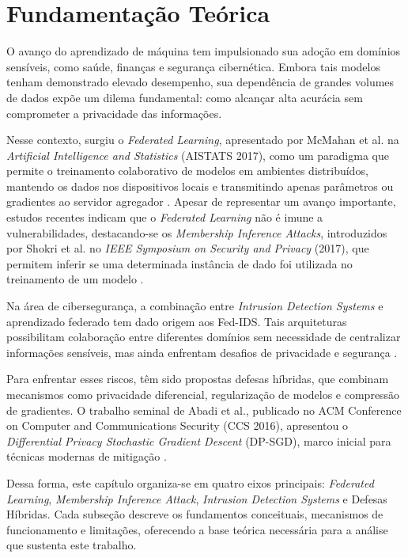 \documentclass[
	12pt,				%
	openright,			%
	oneside,			%
	a4paper,			%
	english,			%
	french,				%
	spanish,			%
	brazil,				%
	]{abntex2}
\begin{document}
\chapter{Fundamentação Teórica}
O avanço do aprendizado de máquina tem impulsionado sua adoção em domínios sensíveis, como saúde, finanças e segurança cibernética. Embora tais modelos tenham demonstrado elevado desempenho, sua dependência de grandes volumes de dados expõe um dilema fundamental: como alcançar alta acurácia sem comprometer a privacidade das informações.

Nesse contexto, surgiu o \textit{Federated Learning}, apresentado por McMahan et al. na \textit{Artificial Intelligence and Statistics} (AISTATS 2017), como um paradigma que permite o treinamento colaborativo de modelos em ambientes distribuídos, mantendo os dados nos dispositivos locais e transmitindo apenas parâmetros ou gradientes ao servidor agregador \cite{mcmahan2017fedavg}. Apesar de representar um avanço importante, estudos recentes indicam que o \textit{Federated Learning} não é imune a vulnerabilidades, destacando-se os \textit{Membership Inference Attacks}, introduzidos por Shokri et al. no \textit{IEEE Symposium on Security and Privacy} (2017), que permitem inferir se uma determinada instância de dado foi utilizada no treinamento de um modelo \cite{shokri2017mia}.

Na área de cibersegurança, a combinação entre \textit{Intrusion Detection Systems} e aprendizado federado tem dado origem aos Fed-IDS. Tais arquiteturas possibilitam colaboração entre diferentes domínios sem necessidade de centralizar informações sensíveis, mas ainda enfrentam desafios de privacidade e segurança \cite{hernandez2023surveyfedids}.

Para enfrentar esses riscos, têm sido propostas defesas híbridas, que combinam mecanismos como privacidade diferencial, regularização de modelos e compressão de gradientes. O trabalho seminal de Abadi et al., publicado no ACM Conference on Computer and Communications Security (CCS 2016), apresentou o \textit{Differential Privacy Stochastic Gradient Descent} (DP-SGD), marco inicial para técnicas modernas de mitigação \cite{abadi2016dpsgd}.

Dessa forma, este capítulo organiza-se em quatro eixos principais: \textit{Federated Learning}, \textit{Membership Inference Attack}, \textit{Intrusion Detection Systems} e Defesas Híbridas. Cada subseção descreve os fundamentos conceituais, mecanismos de funcionamento e limitações, oferecendo a base teórica necessária para a análise que sustenta este trabalho.
\end{document}
